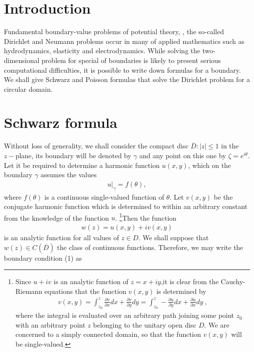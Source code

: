 \documentclass[12pt]{article}
\begin{document}
\section*{Introduction}
Fundamental boundary-value problems of potential theory, , the so-called Dirichlet and Neumann problems occur in many  of applied mathematics such as hydrodynamics, elasticity  and electrodynamics. While solving  the two-dimensional problem for special  of boundaries is likely to present serious computational difficulties, it is possible to write down formulas for a  boundary. We shall give Schwarz and Poisson formulas that solve the Dirichlet problem for a circular domain.
\section*{Schwarz formula}
Without loss of generality, we shall consider the compact disc $\overline{D}:|z|\leq 1$ in the $z-$plane, its boundary will be denoted by $\gamma$ and any point on this one by $\zeta=e^{i\theta}$. Let it be required to determine a harmonic function $u(x,y)$, which on the boundary $\gamma$ assumes the values
\begin{align}
u\big\vert_\gamma=f(\theta),
\end{align}
where $f(\theta)$ is a continuous single-valued function of $\theta$. Let $v(x,y)$ be the conjugate harmonic function which is determined to within an arbitrary constant from the knowledge of the function $u$. {\footnote{Since $u+iv$ is an analytic function of $z=x+iy$,it is clear from the Cauchy-Riemann equations that the function $v(x,y)$ is determined by
\begin{align*}
v(x,y)=\int_{z_0}^z\frac{\partial v}{\partial x}dx+
\frac{\partial v}{\partial y}dy=\int_{z_0}^z -\frac{\partial u}{\partial y}dx+
\frac{\partial u}{\partial x}dy\:,
\end{align*}
where the integral is evaluated over an arbitrary path joining some point $z_0$ with an arbitrary point $z$ belonging to the unitary open disc $D$. We are concerned to a simply connected domain, so that the function $v(x,y)$ will be single-valued.}}Then the function
\begin{align*}
w(z)=u(x,y)+iv(x,y)
\end{align*}
is an analytic function for all values of $z\in D$. We shall suppose that $w(z)\in C(\overline{D})$ the class of continuous functions.  Therefore, we may write the boundary condition (1) as
\end{document}
